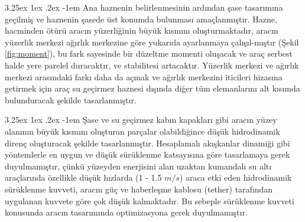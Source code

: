 \documentclass[12pt]{article}
\makeatletter
\renewcommand\paragraph{\@startsection{paragraph}{5}{\z@}%
  {3.25ex \@plus1ex \@minus.2ex}%
  {-1em}%
  {\normalfont\normalsize\bfseries}}
\makeatother
\begin{document}
\paragraph{} Ana haznenin belirlenmesinin ardından şase tasarımına geçilmiş ve haznenin şasede üst konumda bulunması amaçlanmıştır. Hazne, hacminden ötürü aracın yüzerliğinin büyük kısmını oluşturmaktadır, aracın yüzerlik merkezi ağırlık merkezine göre yukarıda ayarlanmaya çalışıl-mıştır (Şekil \ref{fig:moment}), bu fark sayesinde bir düzeltme momenti oluşacak ve araç serbest halde yere parelel duracaktır, ve stabilitesi artacaktır.\cite{BOOK:rovmanual} Yüzerlik merkezi ve ağırlık merkezi arasındaki farkı daha da açmak ve ağırlık merkezini iticileri hizasına getirmek için araç su geçirmez haznesi dışında diğer tüm elemanlarını alt kısımda bulunduracak şekilde tasarlanmıştır.

\newpage

\paragraph{} Şase ve su geçirmez kabın kapakları gibi aracın yüzey alanının büyük kısmını oluşturan parçalar olabildiğince düşük hidrodinamik direnç oluşturacak şekilde tasarlanmıştır. Hesaplamalı akışkanlar dinamiği gibi yöntemlerle en uygun ve düşük sürüklenme katsayısına göre tasarlamaya gerek duyulmamıştır, çünkü yüzeyden enerjisini alan uzaktan kumandalı su altı araçlarında özellikle düşük hızlarda (1 - 1.5 $m/s$) araca etki eden hidrodinamik sürüklenme kuvveti, aracın güç ve haberleşme kablosu (tether) tarafından uygulanan kuvvete göre çok düşük kalmaktadır.\cite{BOOK:rovmanual} Bu sebeple sürüklenme kuvveti konusunda aracın tasarımında optimizasyona gerek duyulmamıştır.
\end{document}
